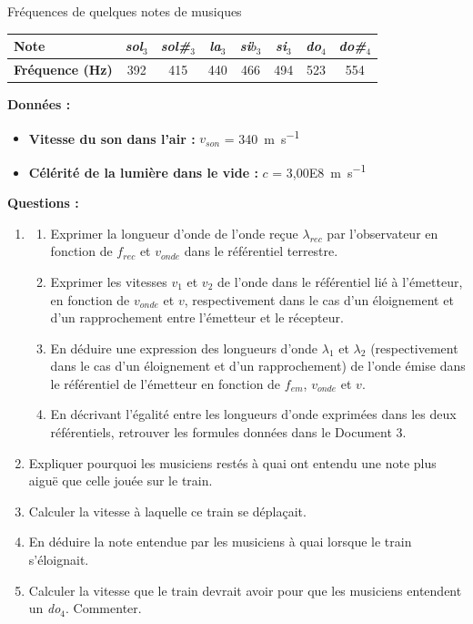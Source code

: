 \documentclass[a4paper,10pt,fleqn]{article}%
\begin{document}
\begin{documentboxenv}{Fréquences de quelques notes de musiques}
\begin{center}
    \begin{tabular}{|>{\centering}m{2cm}|c|c|c|c|c|c|c|}
    \hline \textbf{Note} & \emph{sol$_3$}& \emph{sol\#$_3$}& \emph{la$_3$}& \emph{si$b_3$}& \emph{si$_3$}& \emph{do$_4$}& \emph{do\#$_4$}\\
    \hline \textbf{Fréquence (\unit{\hertz})}& 392 & 415 & 440 & 466 & 494 & 523 & 554\\
    \hline
\end{tabular}
\end{center}


\textbf{Données : }
\begin{itemize}
    \item \textbf{Vitesse du son dans l'air :} $v_{son}$ = \SI{340}{\meter\per\second}
    \item \textbf{Célérité de la lumière dans le vide :} $c$ = \SI{3,00E8}{\meter\per\second}
\end{itemize}
\end{documentboxenv}

\vspace{.5cm}
\textbf{Questions : }
\begin{enumerate}
    \item \begin{enumerate}
        \item Exprimer la longueur d'onde de l'onde reçue $\lambda_{rec}$ par l'observateur en fonction de $f_{rec}$ et $v_{onde}$ dans le référentiel terrestre.
        \item Exprimer les vitesses $v_1$ et $v_2$ de l'onde dans le référentiel lié à l'émetteur, en fonction de $v_{onde}$ et $v$, respectivement dans le cas d'un éloignement et d'un rapprochement entre l'émetteur et le récepteur.
        \item En déduire une expression des longueurs d'onde $\lambda_1$ et $\lambda_2$ (respectivement dans le cas d'un éloignement et d'un rapprochement) de l'onde émise dans le référentiel de l'émetteur en fonction de $f_{em}$, $v_{onde}$ et $v$.
        \item  En décrivant l'égalité entre les longueurs d'onde exprimées dans les deux référentiels, retrouver les formules données dans le Document 3.
    \end{enumerate}
    \item Expliquer pourquoi les musiciens restés à quai ont entendu une note plus aiguë que celle jouée sur le train.
    \item Calculer la vitesse à laquelle ce train se déplaçait.
    \item En déduire la note entendue par les musiciens à quai lorsque le train s'éloignait.
    \item Calculer la vitesse que le train devrait avoir pour que les musiciens entendent un \emph{do$_4$}. Commenter.
\end{enumerate}
\end{document}
